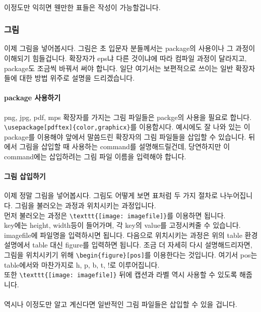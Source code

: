 \paragraph{}
이정도만 익히면 웬만한 표들은 작성이 가능할겁니다.

\subsubsection{그림}
\label{sec:advanced_2-pic}
이제 그림을 넣어봅시다.
그림은 초 입문자 분들께서는 package의 사용이나 그 과정이 이해되기 힘들겁니다.
확장자가 eps냐 다른 것이냐에 따라 컴파일 과정이 달라지고, package도 조금씩 바꿔서 써야 합니다.
일단 여기서는 보편적으로 쓰이는 일반 확장자들에 대한 방법 위주로 설명을 드리겠습니다.

\paragraph{package 사용하기}
png, jpg, pdf, mps 확장자를 가지는 그림 파일들은 packge의 사용을 필요로 합니다.
\verb|\usepackage[pdftex]{color,graphicx}|를 이용합시다.
예시에도 잘 나와 있는 이 package를 이용해야 앞에서 말씀드린 확장자의 그림 파일들을 삽입할 수 있습니다.
뒤에서 그림을 삽입할 때 사용하는 command를 설명해드릴건데, 당연하지만 이 command에는 삽입하려는 그림 파일 이름을 입력해야 합니다.

\paragraph{그림 삽입하기}
이제 정말 그림을 넣어봅시다.
그림도 어떻게 보면 표처럼 두 가지 절차로 나누어집니다.
그림을 불러오는 과정과 위치시키는 과정입니다.\\
먼저 불러오는 과정은 \verb|\texttt{[image: imagefile]}|를 이용하면 됩니다.\\
key에는 height, width등이 들어가며, 각 key의 value를 고정시켜줄 수 있습니다.
imagefile에 파일명을 입력하시면 됩니다.
다음으로 위치시키는 과정은 위의 table 환경 설명에서 table 대신 figure를 입력하면 됩니다.
조금 더 자세히 다시 설명해드리자면, 그림을 위치시키기 위해 \verb|\begin{figure}[pos]|를 이용한다는 것입니다.
여기서 pos는 table에서와 마찬가지로 h, p, b, t, !로 이루어집니다.\\
또한 \verb|\texttt{[image: imagefile]}| 뒤에 캡션과 라벨 역시 사용할 수 있도록 해줍니다.

\paragraph{}
역시나 이정도만 알고 계신다면 일반적인 그림 파일들은 삽입할 수 있을 겁니다.

